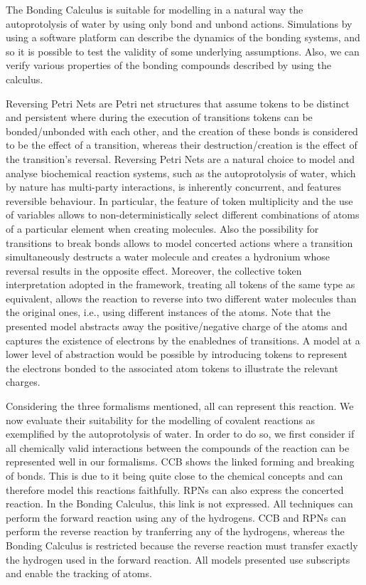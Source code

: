 \documentclass[runningheads]{llncs}
\begin{document}
The Bonding Calculus is suitable for modelling in a natural way the autoprotolysis of water by using only bond and unbond actions. Simulations by using a software platform can describe the dynamics of the bonding systems, and so it is possible to test the validity of some underlying assumptions. Also, we can verify various properties of the bonding compounds described by using the calculus.


Reversing Petri Nets are Petri net structures that assume tokens to be distinct and persistent where during the execution of transitions tokens can be bonded/unbonded with each other, and the creation of these bonds is considered to be the effect of a transition, whereas their destruction/creation is the effect of the transition’s reversal. Reversing Petri Nets are a natural choice to model and analyse biochemical reaction systems, such as the autoprotolysis of water, which by nature
has multi-party interactions, is inherently concurrent, and features reversible behaviour. 
In particular, the feature of token multiplicity and
the use of variables allows to non-deterministically
select different combinations of atoms of a particular element when creating molecules. Also the possibility for
transitions to break bonds allows to model concerted actions where a transition simultaneously
destructs  a water molecule and creates a hydronium whose  reversal results in the opposite effect. Moreover,
the collective token interpretation adopted in the framework, treating all tokens of the same type
as equivalent, allows the reaction to reverse into two different water molecules than the original ones,
i.e., using different instances of the atoms.
Note that the presented model abstracts away the positive/negative charge of the atoms and
captures the existence of electrons by the enablednes of transitions. A model at a lower
level of abstraction would be possible by introducing tokens to represent the electrons  bonded to the associated
atom tokens to illustrate the relevant charges. 


Considering the three formalisms mentioned, all can represent this reaction. We now evaluate their suitability for the modelling of covalent reactions as exemplified by the autoprotolysis of water. In order to do so, we first consider if all chemically valid interactions
between the compounds of the reaction can be represented well in our formalisms. CCB shows the linked forming and breaking of bonds. This is due to it being quite close to the chemical concepts and can therefore model this reactions faithfully. RPNs can also express the concerted reaction. In the Bonding Calculus, this link is not expressed. All techniques can perform the forward reaction using any of the hydrogens. CCB and RPNs can perform the reverse reaction by tranferring any of the hydrogens, whereas the Bonding Calculus is restricted because the reverse reaction must transfer exactly the hydrogen used in the forward reaction. All models presented use subscripts and enable the tracking of atoms.
\end{document}
